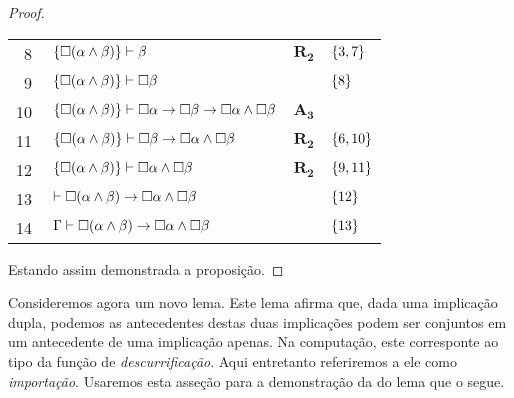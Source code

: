 \begin{tcolorbox}[enhanced jigsaw, breakable, sharp corners, colframe=black, colback=white, boxrule=0.5pt, left=1.5mm, right=1.5mm, top=1.5mm, bottom=1.5mm]
\begin{lemma}
\begin{proof}
\begin{xltabular}{\textwidth}{r | X l l}
            \scriptsize{\phantom{0}8}\phantom{ } & $\ \set{\nec(\alpha\wedge\beta)}\vdash\beta$                                              & $\hyperref[modal.rule.2]{\mathbf{R_2}}$        & $\left\{3,7\right\}$\\[\rowskip]
            \scriptsize{\phantom{0}9}\phantom{ } & $\ \set{\nec(\alpha\wedge\beta)}\vdash\nec\beta$                                          &                       & $\left\{8\right\}$\\[\rowskip]
            \scriptsize{10}\phantom{ }           & $\ \set{\nec(\alpha\wedge\beta)}\vdash\nec\alpha\to\nec\beta\to\nec\alpha\wedge\nec\beta$ & $\hyperref[modal.axiom.3]{\mathbf{A_3}}$       & \\[\rowskip]
            \scriptsize{11}\phantom{ }           & $\ \set{\nec(\alpha\wedge\beta)}\vdash\nec\beta\to\nec\alpha\wedge\nec\beta$              & $\hyperref[modal.rule.2]{\mathbf{R_2}}$        & $\left\{6,10\right\}$\\[\rowskip]
            \scriptsize{12}\phantom{ }           & $\ \set{\nec(\alpha\wedge\beta)}\vdash\nec\alpha\wedge\nec\beta$                          & $\hyperref[modal.rule.2]{\mathbf{R_2}}$        & $\left\{9,11\right\}$\\[\rowskip]
            \scriptsize{13}\phantom{ }           & $\ \vdash\nec(\alpha\wedge\beta)\to\nec\alpha\wedge\nec\beta$                             &                            & $\left\{12\right\}$\\[\rowskip]
            \scriptsize{14}\phantom{ }           & $\ \Gamma\vdash\nec(\alpha\wedge\beta)\to\nec\alpha\wedge\nec\beta$                       &                            & $\left\{13\right\}$
        \end{xltabular}
        \normalsize

        \vspace{0.5\baselineskip}
        Estando assim demonstrada a proposição.
        \end{proof}
    \end{lemma}
\end{tcolorbox}

\vspace{.5\baselineskip}
Consideremos agora um novo lema.
Este lema afirma que, dada uma implicação dupla, podemos as antecedentes destas duas implicações podem ser conjuntos em um antecedente de uma implicação apenas.
Na computação, este corresponte ao tipo da função de \emph{descurrificação}.
Aqui entretanto referiremos a ele como \emph{importação}.
Usaremos esta asseção para a demonstração da do lema que o segue.

